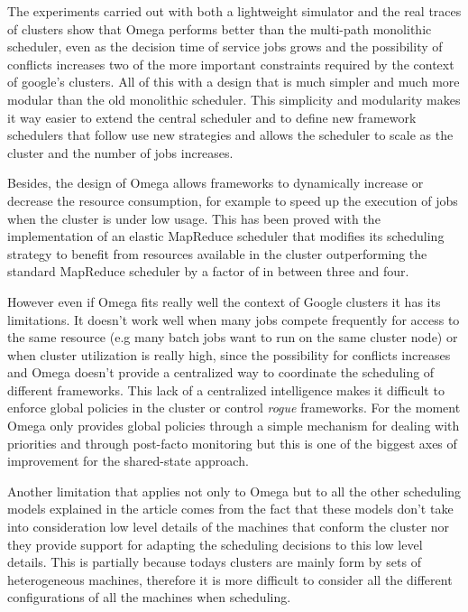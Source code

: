 \documentclass{article}                     %
\begin{document}
The experiments carried out with both a lightweight simulator and the
real traces of clusters show that Omega performs better than the
multi-path monolithic scheduler, even as the decision time of service
jobs grows and the possibility of conflicts increases two of the more
important constraints required by the context of google's
clusters. All of this with a design that is much simpler and much more
modular than the old monolithic scheduler. This simplicity and
modularity makes it way easier to extend the central scheduler and to
define new framework schedulers that follow use new strategies and
allows the scheduler to scale as the cluster and the number of jobs
increases. 

Besides, the design of Omega allows frameworks to dynamically increase
or decrease the resource consumption, for example to speed up the
execution of jobs when the cluster is under low usage. This has been
proved with the implementation of an elastic MapReduce scheduler that
modifies its scheduling strategy to benefit from resources available
in the cluster outperforming the standard MapReduce scheduler by a
factor of in between three and four. 



However even if Omega fits really well the context of Google clusters
it has its limitations. It doesn't work well when many jobs compete
frequently for access to the same resource (e.g many batch jobs want to run
on the same cluster node) or when cluster utilization is really high,
since the possibility for conflicts increases and Omega doesn't
provide a centralized way to coordinate the scheduling of different
frameworks. This lack of a centralized intelligence makes it difficult
to enforce global policies in the cluster or control \emph{rogue}
frameworks. For the moment Omega only provides global policies through
a simple mechanism for dealing with priorities and through post-facto
monitoring but this is one of the biggest axes of improvement for the
shared-state approach.

Another limitation that applies not only to Omega but to all the other
scheduling models explained in the article comes from the fact that
these models don't take into consideration low level details of the
machines that conform the cluster nor they provide support for 
adapting the scheduling decisions to this low level details. This is
partially because todays clusters are mainly form by sets of heterogeneous
machines, therefore it is more difficult to consider all the different
configurations of all the machines when scheduling.
\end{document}
